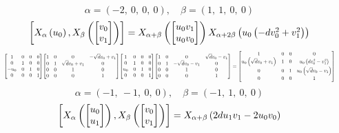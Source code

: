 \documentclass[11pt]{article}
\theoremstyle{definition}
\begin{document}
\[
\alpha = \left( -2, \  0, \  0, \  0\right), \quad \beta = \left( 1, \  1, \  0, \  0\right)
\]
\[
\scaletoalign{\textwidth}{\left[ X_{\alpha}\left(u_{0}\right), X_{\beta}\left(\left[\begin{matrix}v_{0}\\v_{1}\end{matrix}\right]\right) \right] = X_{\alpha + \beta}\left(\left[\begin{matrix}u_{0} v_{1}\\u_{0} v_{0}\end{matrix}\right]\right) X_{\alpha + 2\beta}\left(u_{0} \left(- d v_{0}^{2} + v_{1}^{2}\right)\right)}
\]
\[
\scaletoalign{\textwidth}{{\left[\begin{matrix}1 & 0 & 0 & 0\\0 & 1 & 0 & 0\\- u_{0} & 0 & 1 & 0\\0 & 0 & 0 & 1\end{matrix}\right]} {\left[\begin{matrix}1 & 0 & 0 & - \sqrt{d} v_{0} + v_{1}\\0 & 1 & \sqrt{d} v_{0} + v_{1} & 0\\0 & 0 & 1 & 0\\0 & 0 & 0 & 1\end{matrix}\right]} {\left[\begin{matrix}1 & 0 & 0 & 0\\0 & 1 & 0 & 0\\u_{0} & 0 & 1 & 0\\0 & 0 & 0 & 1\end{matrix}\right]} {\left[\begin{matrix}1 & 0 & 0 & \sqrt{d} v_{0} - v_{1}\\0 & 1 & - \sqrt{d} v_{0} - v_{1} & 0\\0 & 0 & 1 & 0\\0 & 0 & 0 & 1\end{matrix}\right]} = {\left[\begin{matrix}1 & 0 & 0 & 0\\u_{0} \left(\sqrt{d} v_{0} + v_{1}\right) & 1 & 0 & u_{0} \left(d v_{0}^{2} - v_{1}^{2}\right)\\0 & 0 & 1 & u_{0} \left(\sqrt{d} v_{0} - v_{1}\right)\\0 & 0 & 0 & 1\end{matrix}\right]}}
\]
\[
\alpha = \left( -1, \  -1, \  0, \  0\right), \quad \beta = \left( -1, \  1, \  0, \  0\right)
\]
\[
\scaletoalign{\textwidth}{\left[ X_{\alpha}\left(\left[\begin{matrix}u_{0}\\u_{1}\end{matrix}\right]\right), X_{\beta}\left(\left[\begin{matrix}v_{0}\\v_{1}\end{matrix}\right]\right) \right] = X_{\alpha + \beta}\left(2 d u_{1} v_{1} - 2 u_{0} v_{0}\right)}
\]
\end{document}
